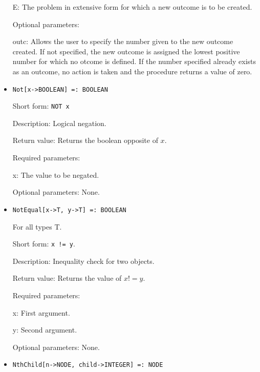 \begin{itemize}
\bd
\item
[E:] The problem in extensive form for which a new outcome is to be
created.
\ed

\item
[Optional parameters:]\hfil\null

\bd
\item
[outc:] Allows the user to specify the number given to the new outcome
created.  If not specified, the new outcome is assigned the lowest
positive number for which no otcome is defined.  If the number
specified already exists as an outcome, no action is taken and the
procedure returns a value of zero.
\ed
\ed

\item
\protect \large \begin{verbatim}
Not[x->BOOLEAN] =: BOOLEAN
\end{verbatim}\normalsize

\bd
\item
[Short form:] \verb+NOT x+
\item
[Description:] Logical negation.
\item
[Return value:] Returns the boolean opposite of $x$.  
\item
[Required parameters:]\hfil\null
\bd
\item
[x:] The value to be negated.
\ed
\item
[Optional parameters:] None.
\ed

\item
\protect \large \begin{verbatim}
NotEqual[x->T, y->T] =: BOOLEAN
\end{verbatim}\normalsize

For all types T.

\bd
\item
[Short form:] \verb+x != y+.
\item
[Description:] Inequality check for two objects.
\item
[Return value:] Returns the value of $x != y$.
\item
[Required parameters:]\hfil\null
	
\bd
\item
[x:] First argument.
\item
[y:] Second argument.
\ed

\item
[Optional parameters:] None.

\ed

\item
\protect \large \begin{verbatim}
NthChild[n->NODE, child->INTEGER] =: NODE
\end{verbatim}\normalsize


\end{itemize}
